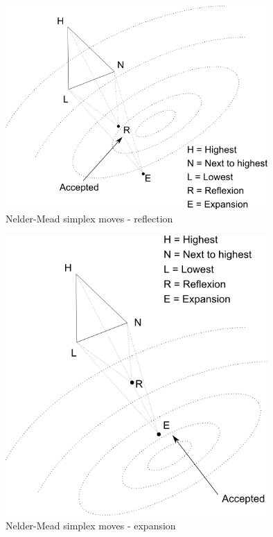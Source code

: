 \begin{figure}
\begin{center}
\includegraphics[width=10cm]{nelder-mead-reflection.png}
\end{center}
\caption{Nelder-Mead simplex moves - reflection}
\label{fig-nm-moves-reflection}
\end{figure}

\begin{figure}
\begin{center}
\includegraphics[width=10cm]{nelder-mead-extension.png}
\end{center}
\caption{Nelder-Mead simplex moves - expansion}
\label{fig-nm-moves-expansion}
\end{figure}

